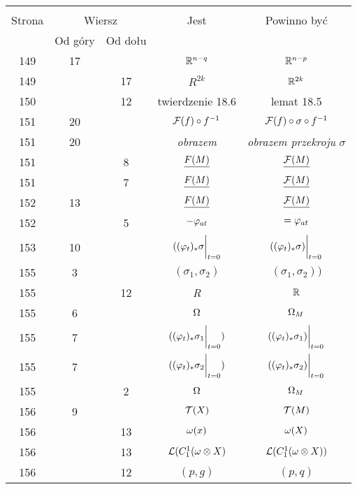 \documentclass[a4paper,11pt]{article}
\begin{document}
\begin{center}
  \begin{tabular}{|c|c|c|c|c|}
    \hline
    & \multicolumn{2}{c|}{} & & \\
    Strona & \multicolumn{2}{c|}{Wiersz} & Jest
                              & Powinno być \\ \cline{2-3}
    & Od góry & Od dołu & & \\
    \hline
    149 & 17 & & $\mathbb{R}^{ n - q }$ & $\mathbb{R}^{ n - p }$ \\
    149 & & 17 & $R^{ 2k }$ & $\mathbb{R}^{ 2k }$ \\
    150 & & 12 & twierdzenie 18.6 & lemat 18.5 \\
    151 & 20 & & $\mathcal{F}( f ) \circ f^{ -1 }$
           & $\mathcal{F}( f ) \circ \sigma \circ f^{ -1 }$ \\
    151 & 20 & & \emph{obrazem} & \emph{obrazem przekroju} $\sigma$ \\
    151 & &  8 & $\underline{ F( M ) }$ & $\underline{ \mathcal{F}( M ) }$ \\
    151 & &  7 & $\underline{ F( M ) }$ & $\underline{ \mathcal{F}( M ) }$ \\
    152 & 13 & & $\underline{ F( M ) }$ & $\underline{ \mathcal{F}( M ) }$ \\
    152 & &  5 & $-\varphi_{ a t }$ & $= \varphi_{ a t }$ \\
    153 & 10 & & $( ( \varphi_{ t } )_{ * } \sigma \bigg|_{ t = 0 }$
           & $( ( \varphi_{ t } )_{ * } \sigma )\bigg|_{ t = 0 }$ \\
    155 &  3 & & $( \sigma_{ 1 }, \sigma_{ 2 } )$
           & $( \sigma_{ 1 }, \sigma_{ 2 } ) )$ \\
    155 & & 12 & \emph{R} & \emph{$\mathbb{R}$} \\
    155 &  6 & & $\Omega$ & $\Omega_{ M }$ \\
    155 &  7 & & $( ( \varphi_{ t } )_{ * } \sigma_{ 1 } \bigg|_{ t = 0 } )$
           & $( ( \varphi_{ t } )_{ * } \sigma_{ 1 } )\bigg|_{ t = 0 }$ \\
    155 &  7 & & $( ( \varphi_{ t } )_{ * } \sigma_{ 2 } \bigg|_{ t = 0 } )$
           & $( ( \varphi_{ t } )_{ * } \sigma_{ 2 } )\bigg|_{ t = 0 }$ \\
    155 & &  2 & $\Omega$ & $\Omega_{ M }$ \\
    156 &  9 & & $\mathcal{T}( X )$ & $\mathcal{T}( M )$ \\
    156 & & 13 & $\omega( x )$ & $\omega( X )$ \\
    156 & & 13 & $\mathcal{L}( C^{ 1 }_{ 1 }( \omega \otimes X )$
           & $\mathcal{L}( C^{ 1 }_{ 1 }( \omega \otimes X ) )$ \\
    156 & & 12 & $( p, g )$ & $( p, q )$ \\

\end{tabular}
\end{center}
\end{document}
